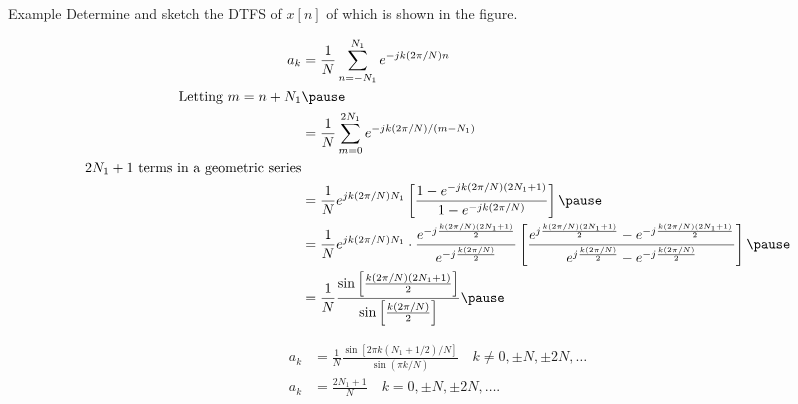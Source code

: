\begin{frame}{Example}
    Determine and sketch the DTFS of $x[n]$ of which is shown in the figure.
    \begin{figure}
        \centering
        
    \end{figure}
    \pause
\end{frame}


\begin{frame}
    {
        \begin{align*}
                a_k &= \frac{1}{N}\sum_{n=-N_1}^{N_1}e^{-jk(2\pi/N)n}\\
                \text{Letting~} m = n+N_1&\pause\\
                &= \frac{1}{N}\sum_{m=0}^{2N_1}e^{-jk(2\pi/N)/(m- N_1)}\\
                2N_1 + 1\text{~terms in a geometric series}&\\
                &= \frac{1}{N}e^{jk(2\pi/N)N_1}\left[\frac{1 - e^{-jk(2\pi/N)(2N_1 + 1)}}{1 - e^{-jk(2\pi/N)}}\right]\pause\\
                &=  \frac{1}{N} e^{jk(2\pi/N)N_1} \cdot
                \frac{
                    e^{-j\frac{k(2\pi/N)(2N_1+1)}{2}}
                }{
                e^{-j\frac{k(2\pi/N)}{2}}
                } \left[
                \frac{e^{j\frac{k(2\pi/N)(2N_1+1)}{2}}  - e^{-j\frac{k(2\pi/N)(2N_1+1)}{2}} }
                {e^{j\frac{k(2\pi/N)}{2}} - e^{-j\frac{k(2\pi/N)}{2}}}\right]\pause\\
                &=  \frac{1}{N} \frac{\sin\left[ \frac{k(2\pi/N)(2N_1+1)}{2} \right]}{\sin\left[\frac{k(2\pi/N)}{2}\right]}\pause\\
        \end{align*}
    }
\end{frame}

\begin{frame}
    {
        \begin{align*}
                a_k &=  \frac{1}{N} \frac{\sin\left[ 2\pi k(N_1+1/2)/N \right]}{\sin(\pi k/N)}\quad k \neq 0, \pm N, \pm 2N, \dots\\
                a_k &= \frac{2N_1+1}{N}\quad k = 0, \pm N, \pm 2N, \dots.
        \end{align*}
    }
\end{frame}

\begin{frame}
    \begin{figure}
        \centering
        
    \end{figure}
\end{frame}



